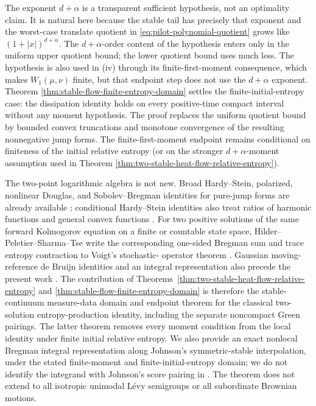 \begin{remark}
\label{rem:stable-flow-domain-novelty-boundary}
The exponent \(d+\alpha\) is a transparent sufficient hypothesis, not an
optimality claim.  It is natural here because the stable tail has precisely
that exponent and the worst-case translate quotient in
\eqref{eq:pilot-polynomial-quotient} grows like
\((1+|x|)^{d+\alpha}\).  The \(d+\alpha\)-order content of the hypothesis
enters only in the uniform upper quotient bound; the lower quotient bound
uses much less.  The hypothesis is also used in \textup{(iv)} through its
finite-first-moment consequence, which makes \(W_1(\mu,\nu)\) finite, but
that endpoint step does not use the \(d+\alpha\) exponent.  Theorem
\ref{thm:stable-flow-finite-entropy-domain} settles the finite-initial-entropy
case: the dissipation identity holds on every positive-time compact interval
without any moment hypothesis.  The proof replaces the uniform quotient bound
by bounded convex truncations and monotone convergence of the resulting
nonnegative jump forms.  The finite-first-moment endpoint remains conditional
on finiteness of the initial relative entropy (or on the stronger
\(d+\alpha\)-moment assumption used in Theorem
\ref{thm:two-stable-heat-flow-relative-entropy}).

The two-point logarithmic algebra is not new.  Broad Hardy--Stein,
polarized, nonlinear Douglas, and Sobolev--Bregman identities for pure-jump
forms are already available
\cite{BanuelosBogdanLuks2016HardyStein,Gutowski2023HardySteinPureJump,
BogdanGrzywnyPietruskaPalubaRutkowski2023NonlinearNonlocalDouglas,
GutowskiKwasnicki2025BeurlingDenySobolevBregman,
BogdanGutowskiPietruskaPaluba2025PolarizedHardyStein}; conditional
Hardy--Stein identities also treat ratios of harmonic functions and general
convex functions \cite{KlimsiakRozkosz2025ConditionalHardyStein}.  For two
positive solutions of the same forward Kolmogorov equation on a finite or
countable state space, Hilder--Peletier--Sharma--Tse write the corresponding
one-sided Bregman sum and trace entropy contraction to Voigt's stochastic-
operator theorem
\cite{HilderPeletierSharmaTse2020EntropyDistance,Voigt1981StochasticOperators}.
Gaussian moving-reference de Bruijn identities and an integral
representation also precede the present work
\cite{HirataNemotoYoshida2012IntegralRepresentation}.  The contribution of
Theorems~\ref{thm:two-stable-heat-flow-relative-entropy} and
\ref{thm:stable-flow-finite-entropy-domain} is therefore the
stable-continuum measure-data domain and endpoint theorem for the classical
two-solution entropy-production identity, including the separate noncompact
Green pairings.  The latter theorem removes every moment condition from the
local identity under finite initial relative entropy.  We also provide an
exact nonlocal Bregman integral representation along Johnson's
symmetric-stable interpolation, under the stated finite-moment and
finite-initial-entropy domain; we do not identify the integrand with Johnson's
score pairing in
\cite[Theorem~5.1]{Johnson2013StableDeBruijn}.  The theorem does not extend
to all isotropic unimodal L\'evy semigroups or all subordinate Brownian
motions.
\end{remark}
